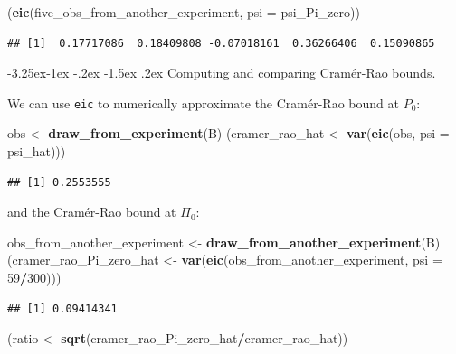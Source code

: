 \documentclass[]{article}
\makeatletter
\newenvironment{Shaded}{\begin{snugshade}}{\end{snugshade}}
\newcommand{\DataTypeTok}[1]{\textcolor[rgb]{0.13,0.29,0.53}{#1}}
\newcommand{\DecValTok}[1]{\textcolor[rgb]{0.00,0.00,0.81}{#1}}
\newcommand{\KeywordTok}[1]{\textcolor[rgb]{0.13,0.29,0.53}{\textbf{#1}}}
\newcommand{\NormalTok}[1]{#1}
\newcommand{\OperatorTok}[1]{\textcolor[rgb]{0.81,0.36,0.00}{\textbf{#1}}}
\newcommand{\StringTok}[1]{\textcolor[rgb]{0.31,0.60,0.02}{#1}}
\renewcommand\subsection{\@startsection{subsection}{3}{\z@}%
                                     {-3.25ex\@plus -1ex \@minus -.2ex}%
                                     {-1.5ex \@plus .2ex}%
                                     {\normalfont\normalsize\bfseries}}
\theoremstyle{definition}
\theoremstyle{definition}
\theoremstyle{definition}
\theoremstyle{remark}
\makeatother
\begin{document}
\begin{Shaded}
\begin{Highlighting}[]
\NormalTok{(}\KeywordTok{eic}\NormalTok{(five_obs_from_another_experiment, }\DataTypeTok{psi =}\NormalTok{ psi_Pi_zero))}
\end{Highlighting}
\end{Shaded}

\begin{verbatim}
## [1]  0.17717086  0.18409808 -0.07018161  0.36266406  0.15090865
\end{verbatim}

\subsection{Computing and comparing Cramér-Rao bounds.}

We can use \texttt{eic} to numerically approximate the Cramér-Rao bound
at \(P_{0}\):

\begin{Shaded}
\begin{Highlighting}[]
\NormalTok{obs <-}\StringTok{ }\KeywordTok{draw_from_experiment}\NormalTok{(B)}
\NormalTok{(cramer_rao_hat <-}\StringTok{ }\KeywordTok{var}\NormalTok{(}\KeywordTok{eic}\NormalTok{(obs, }\DataTypeTok{psi =}\NormalTok{ psi_hat)))}
\end{Highlighting}
\end{Shaded}

\begin{verbatim}
## [1] 0.2553555
\end{verbatim}

and the Cramér-Rao bound at \(\Pi_{0}\):

\begin{Shaded}
\begin{Highlighting}[]
\NormalTok{obs_from_another_experiment <-}\StringTok{ }\KeywordTok{draw_from_another_experiment}\NormalTok{(B)}
\NormalTok{(cramer_rao_Pi_zero_hat <-}\StringTok{ }\KeywordTok{var}\NormalTok{(}\KeywordTok{eic}\NormalTok{(obs_from_another_experiment, }\DataTypeTok{psi =} \DecValTok{59}\OperatorTok{/}\DecValTok{300}\NormalTok{)))}
\end{Highlighting}
\end{Shaded}

\begin{verbatim}
## [1] 0.09414341
\end{verbatim}

\begin{Shaded}
\begin{Highlighting}[]
\NormalTok{(ratio <-}\StringTok{ }\KeywordTok{sqrt}\NormalTok{(cramer_rao_Pi_zero_hat}\OperatorTok{/}\NormalTok{cramer_rao_hat))}
\end{Highlighting}
\end{Shaded}
\end{document}
